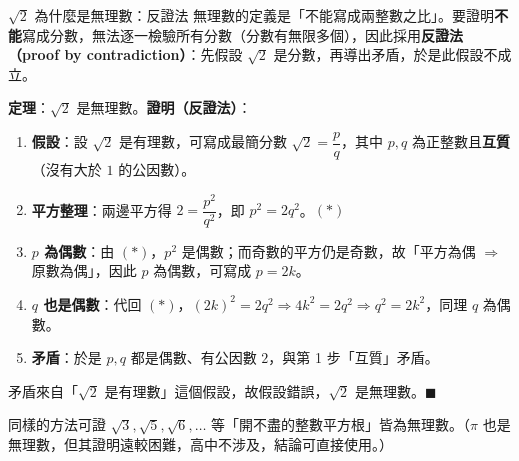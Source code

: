 \documentclass[11pt]{article}
\begin{document}
\begin{延伸框}{$\sqrt2$ 為什麼是無理數：反證法}
無理數的定義是「不能寫成兩整數之比」。要證明\textbf{不能}寫成分數，無法逐一檢驗所有分數（分數有無限多個），因此採用\textbf{反證法（proof by contradiction）}：先假設 $\sqrt2$ 是分數，再導出矛盾，於是此假設不成立。

\textbf{定理}：$\sqrt2$ 是無理數。\quad\textbf{證明（反證法）}：
\begin{enumerate}\setlength{\itemsep}{1pt}
\item \textbf{假設}：設 $\sqrt2$ 是有理數，可寫成最簡分數 $\sqrt2=\dfrac{p}{q}$，其中 $p,q$ 為正整數且\textbf{互質}（沒有大於 $1$ 的公因數）。
\item \textbf{平方整理}：兩邊平方得 $2=\dfrac{p^2}{q^2}$，即 $p^2=2q^2$。\hfill$(\ast)$
\item \textbf{$p$ 為偶數}：由 $(\ast)$，$p^2$ 是偶數；而奇數的平方仍是奇數，故「平方為偶 $\Rightarrow$ 原數為偶」，因此 $p$ 為偶數，可寫成 $p=2k$。
\item \textbf{$q$ 也是偶數}：代回 $(\ast)$，$(2k)^2=2q^2\Rightarrow 4k^2=2q^2\Rightarrow q^2=2k^2$，同理 $q$ 為偶數。
\item \textbf{矛盾}：於是 $p,q$ 都是偶數、有公因數 $2$，與第 1 步「互質」矛盾。
\end{enumerate}
矛盾來自「$\sqrt2$ 是有理數」這個假設，故假設錯誤，$\sqrt2$ 是無理數。$\blacksquare$

同樣的方法可證 $\sqrt3,\sqrt5,\sqrt6,\ldots$ 等「開不盡的整數平方根」皆為無理數。（$\pi$ 也是無理數，但其證明遠較困難，高中不涉及，結論可直接使用。）
\end{延伸框}
\end{document}
